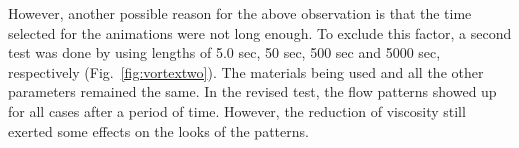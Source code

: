 \documentclass[11pt]{article}
\numberwithin{figure}{section}  %
\numberwithin{equation}{section}  %
\begin{document}
\begin{multicols}{2}
However, another possible reason for the above observation is that the time selected for the animations were not long enough. To exclude this factor, a second test was done by using lengths of 5.0 sec, 50 sec, 500 sec and 5000 sec, respectively (Fig.\ \ref{fig:vortextwo}). The materials being used and all the other parameters remained the same. In the revised test, the flow patterns showed up for all cases after a period of time. However, the reduction of viscosity still exerted some effects on the looks of the patterns.

\begin{figure}[!htb]
	\centering
\end{figure}
\end{multicols}
\end{document}
